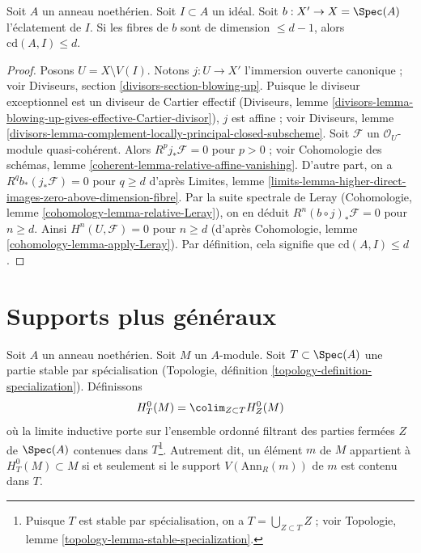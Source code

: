 \begin{lemma}
\label{lemma-cd-blowup}
Soit $A$ un anneau noethérien. Soit $I \subset A$ un idéal. Soit $b : X' \to X = \Spec(A)$ l'éclatement de $I$. Si les fibres de $b$ sont de dimension $\leq d - 1$, alors $\text{cd}(A, I) \leq d$.
\end{lemma}

\begin{proof}
Posons $U = X \setminus V(I)$. Notons $j : U \to X'$ l'immersion ouverte canonique ; voir Diviseurs, section \ref{divisors-section-blowing-up}. Puisque le diviseur exceptionnel est un diviseur de Cartier effectif (Diviseurs, lemme \ref{divisors-lemma-blowing-up-gives-effective-Cartier-divisor}), $j$ est affine ; voir Diviseurs, lemme \ref{divisors-lemma-complement-locally-principal-closed-subscheme}. Soit $\mathcal{F}$ un $\mathcal{O}_U$-module quasi-cohérent. Alors $R^pj_*\mathcal{F} = 0$ pour $p > 0$ ; voir Cohomologie des schémas, lemme \ref{coherent-lemma-relative-affine-vanishing}. D'autre part, on a $R^qb_*(j_*\mathcal{F}) = 0$ pour $q \geq d$ d'après Limites, lemme \ref{limits-lemma-higher-direct-images-zero-above-dimension-fibre}. Par la suite spectrale de Leray (Cohomologie, lemme \ref{cohomology-lemma-relative-Leray}), on en déduit $R^n(b \circ j)_*\mathcal{F} = 0$ pour $n \geq d$. Ainsi $H^n(U, \mathcal{F}) = 0$ pour $n \geq d$ (d'après Cohomologie, lemme \ref{cohomology-lemma-apply-Leray}). Par définition, cela signifie que $\text{cd}(A, I) \leq d$.
\end{proof}







\section{Supports plus généraux}
\label{section-supports}

\noindent
Soit $A$ un anneau noethérien. Soit $M$ un $A$-module. Soit $T \subset \Spec(A)$ une partie stable par spécialisation (Topologie, définition \ref{topology-definition-specialization}). Définissons
$$
H^0_T(M) = \colim_{Z \subset T} H^0_Z(M)
$$
où la limite inductive porte sur l'ensemble ordonné filtrant des parties fermées $Z$ de $\Spec(A)$ contenues dans $T$\footnote{Puisque $T$ est stable par spécialisation, on a $T = \bigcup_{Z \subset T} Z$ ; voir Topologie, lemme \ref{topology-lemma-stable-specialization}.}. Autrement dit, un élément $m$ de $M$ appartient à $H^0_T(M) \subset M$ si et seulement si le support $V(\text{Ann}_R(m))$ de $m$ est contenu dans $T$.

